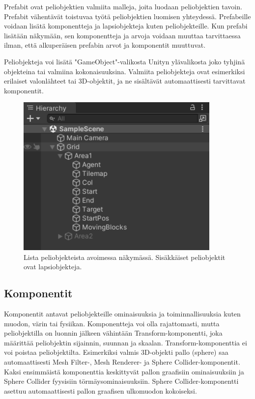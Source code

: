 \documentclass[utf8]{gradu3}
\begin{document}
Prefabit ovat peliobjektien valmiita malleja, joita luodaan peliobjektien tavoin. Prefabit vähentävät toistuvaa työtä peliobjektien luomisen yhteydessä. Prefabeille voidaan lisätä komponentteja ja lapsiobjekteja kuten peliobjekteille. Kun prefabi lisätään näkymään, sen komponentteja ja arvoja voidaan muuttaa tarvittaessa ilman, että alkuperäisen prefabin arvot ja komponentit muuttuvat.

Peliobjekteja voi lisätä "GameObject"-valikosta Unityn ylävalikosta joko tyhjinä objekteina tai valmiina kokonaisuuksina. Valmiita peliobjekteja ovat esimerkiksi erilaiset valonlähteet tai 3D-objektit, ja ne sisältävät automaattisesti tarvittavat komponentit.

\begin{figure}[h]
\centering
\includegraphics[width=10cm]{peliobjektilistaus.png}
\caption{Lista peliobjekteista avoimessa näkymässä. Sisäkkäiset peliobjektit ovat lapsiobjekteja.}
\label{peliobjektikuva}
\end{figure}

\subsection{Komponentit}

Komponentit antavat peliobjekteille ominaisuuksia ja toiminnallisuuksia kuten muodon, värin tai fysiikan. Komponentteja voi olla rajattomasti, mutta peliobjektilla on luonnin jälkeen vähintään Transform-komponentti, joka määrittää peliobjektin sijainnin, suunnan ja skaalan. Transform-komponenttia ei voi poistaa peliobjektilta. Esimerkiksi valmis 3D-objekti pallo (sphere) saa automaattisesti Mesh Filter-, Mesh Renderer- ja Sphere Collider-komponentit. Kaksi ensimmäistä komponenttia keskittyvät pallon graafisiin ominaisuuksiin ja Sphere Collider fyysisiin törmäysominaisuuksiin. Sphere Collider-komponentti asettuu automaattisesti pallon graafisen ulkomuodon kokoiseksi.
\end{document}
